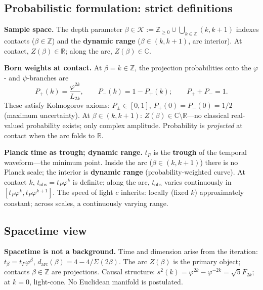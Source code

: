 \documentclass[12pt,a4paper]{article}
\begin{document}
\subsection{Probabilistic formulation: strict definitions}
\label{sec:prob-strict}

\textbf{Sample space.} The depth parameter $\beta \in \mathcal{K} := \mathbb{Z}_{\geq 0} \cup \bigcup_{k\in\mathbb{Z}}(k,k+1)$ indexes contacts ($\beta \in \mathbb{Z}$) and the \textbf{dynamic range} ($\beta \in (k,k+1)$, arc interior). At contact, $Z(\beta) \in \mathbb{R}$; along the arc, $Z(\beta) \in \mathbb{C}$.

\textbf{Born weights at contact.} At $\beta = k \in \mathbb{Z}$, the projection probabilities onto the $\varphi$- and $\psi$-branches are
\begin{equation}
P_+(k) = \frac{\varphi^{2k}}{L_{2k}}, \qquad P_-(k) = 1 - P_+(k); \qquad P_+ + P_- = 1.
\label{eq:born-strict}
\end{equation}
These satisfy Kolmogorov axioms: $P_\pm \in [0,1]$, $P_+(0) = P_-(0) = 1/2$ (maximum uncertainty). At $\beta \in (k,k+1)$: $Z(\beta) \in \mathbb{C} \setminus \mathbb{R}$---no classical real-valued probability exists; only complex amplitude. Probability is \emph{projected} at contact when the arc folds to $\mathbb{R}$.

\textbf{Planck time as trough; dynamic range.} $t_P$ is the \textbf{trough} of the temporal waveform---the minimum point. Inside the arc ($\beta \in (k,k+1)$) there is no Planck scale; the interior is \textbf{dynamic range} (probability-weighted curve). At contact $k$, $t_{\mathrm{obs}} = t_P\varphi^k$ is definite; along the arc, $t_{\mathrm{obs}}$ varies continuously in $[t_P\varphi^k, t_P\varphi^{k+1}]$. The speed of light $c$ inherits: locally (fixed $k$) approximately constant; across scales, a continuously varying range.

\subsection{Spacetime view}
\label{sec:new-spacetime-view}

\textbf{Spacetime is not a background.} Time and dimension arise from the iteration: $t_\beta = t_P\varphi^\beta$, $d_{\mathrm{arc}}(\beta) = 4 - 4/\Sigma(2\beta)$. The arc $Z(\beta)$ is the primary object; contacts $\beta \in \mathbb{Z}$ are projections. Causal structure: $s^2(k) = \varphi^{2k} - \varphi^{-2k} = \sqrt{5}F_{2k}$; at $k=0$, light-cone. No Euclidean manifold is postulated.
\end{document}
